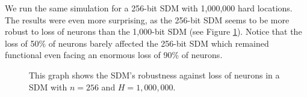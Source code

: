 We run the same simulation for a 256-bit SDM with 1,000,000 hard locations. The results were even more surprising, as the 256-bit SDM seems to be more robust to loss of neurons than the 1,000-bit SDM (see Figure \ref{fig:sdm-neuron-death-256bits}). Notice that the loss of 50\% of neurons barely affected the 256-bit SDM which remained functional even facing an enormous loss of 90\% of neurons.

\begin{figure}[!p]
\centering
{}


\caption{This graph shows the SDM's robustness against loss of neurons in a SDM with $n=256$ and $H=1,000,000$.
\label{fig:sdm-neuron-death-256bits}}
\end{figure}


